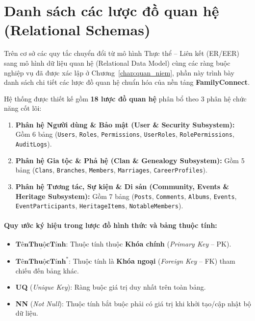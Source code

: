 \section{Danh sách các lược đồ quan hệ (Relational Schemas)}
\label{sec:2_2_luoc_do_quan_he}

Trên cơ sở các quy tắc chuyển đổi từ mô hình Thực thể -- Liên kết (ER/EER) sang mô hình dữ liệu quan hệ (Relational Data Model) cùng các ràng buộc nghiệp vụ đã được xác lập ở Chương~\ref{chap:quan_niem}, phần này trình bày danh sách chi tiết các lược đồ quan hệ chuẩn hóa của nền tảng \textbf{FamilyConnect}.

Hệ thống được thiết kế gồm \textbf{18 lược đồ quan hệ} phân bổ theo 3 phân hệ chức năng cốt lõi:
\begin{enumerate}[noitemsep,topsep=2pt]
    \item \textbf{Phân hệ Người dùng \& Bảo mật (User \& Security Subsystem):} Gồm 6 bảng (\texttt{Users}, \texttt{Roles}, \texttt{Permissions}, \texttt{UserRoles}, \texttt{RolePermissions}, \texttt{AuditLogs}).
    \item \textbf{Phân hệ Gia tộc \& Phả hệ (Clan \& Genealogy Subsystem):} Gồm 5 bảng (\texttt{Clans}, \texttt{Branches}, \texttt{Members}, \texttt{Marriages}, \texttt{CareerProfiles}).
    \item \textbf{Phân hệ Tương tác, Sự kiện \& Di sản (Community, Events \& Heritage Subsystem):} Gồm 7 bảng (\texttt{Posts}, \texttt{Comments}, \texttt{Albums}, \texttt{Events}, \texttt{EventParticipants}, \texttt{HeritageItems}, \texttt{NotableMembers}).
\end{enumerate}

\paragraph{Quy ước ký hiệu trong lược đồ hình thức và bảng thuộc tính:}
\begin{itemize}[noitemsep,topsep=2pt]
    \item $\underline{\textbf{TênThuộcTính}}$: Thuộc tính thuộc \textbf{Khóa chính} (\textit{Primary Key} -- PK).
    \item $\textbf{TênThuộcTính}^*$: Thuộc tính là \textbf{Khóa ngoại} (\textit{Foreign Key} -- FK) tham chiếu đến bảng khác.
    \item \textbf{UQ} (\textit{Unique Key}): Ràng buộc giá trị duy nhất trên toàn bảng.
    \item \textbf{NN} (\textit{Not Null}): Thuộc tính bắt buộc phải có giá trị khi khởi tạo/cập nhật bộ dữ liệu.
\end{itemize}

